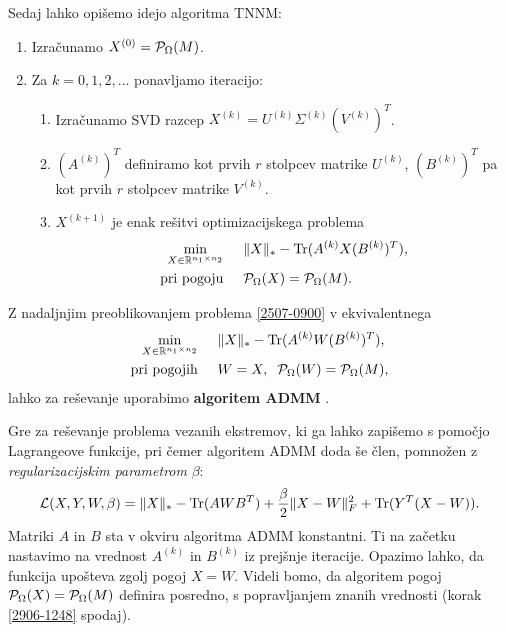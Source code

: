 Sedaj lahko opišemo idejo algoritma TNNM:
\begin{enumerate}
    \item Izračunamo $X^{(0)} = \mathcal{P}_\Omega(M)$.
    \item Za $k=0,1,2,\ldots$ ponavljamo iteracijo:
          \begin{enumerate}
              \item Izračunamo SVD razcep
                    $X^{(k)} = U^{(k)} \Sigma^{(k)} (V^{(k)})^T$.
              \item $(A^{(k)})^T$ definiramo kot prvih    $r$ stolpcev matrike $U^{(k)}$,
                    $(B^{(k)})^T$ pa kot prvih
                    $r$ stolpcev matrike $V^{(k)}$.
              \item $X^{(k+1)}$ je enak rešitvi
                    optimizacijskega problema
                    \begin{align}
                        \label{2507-0900}
                        \begin{split}
                            \min_{X\in  \mathbb{R}^{n_1 \times n_2}} \hspace{0.5cm}         & \lVert X\rVert_* - \operatorname{Tr}(A^{(k)}X(B^{(k)})^T), \\
                            \text{pri pogoju} \hspace{0.5cm} & \mathcal{P}_\Omega(X) = \mathcal{P}_\Omega(M).
                        \end{split}
                    \end{align}
          \end{enumerate}
\end{enumerate}
Z nadaljnjim preoblikovanjem problema
\eqref{2507-0900} v ekvivalentnega
\begin{align}
    \label{1307-1527}
    \begin{split}
        \min_{X\in  \mathbb{R}^{n_1 \times n_2}}  \hspace{0.5cm}         & \lVert X\rVert_* - \operatorname{Tr}(A^{(k)}W(B^{(k)})^T),  \\
        \text{pri pogojih} \hspace{0.5cm} & W=X, \hspace{0.2cm} \mathcal{P}_\Omega(W) = \mathcal{P}_\Omega(M),
    \end{split}
\end{align}
lahko za reševanje uporabimo \textbf{algoritem ADMM} \cite{TNNM-HZYLH12}.

Gre za reševanje problema vezanih ekstremov, ki ga lahko zapišemo s pomočjo Lagrangeove funkcije, pri čemer algoritem ADMM doda še
člen, pomnožen z \textit{regularizacijskim parametrom} $\beta$:
\[
    \mathcal{L}(X, Y, W, \beta) = \lVert X\rVert_* - \operatorname{Tr}(A W B^T) + \frac{\beta}{2} \lVert X - W\rVert_F^2 + \operatorname{Tr}(Y^T(X-W)).
\]
Matriki $A$ in $B$ sta v okviru algoritma ADMM konstantni. Ti na začetku nastavimo na vrednost $A^{(k)}$ in $B^{(k)}$ iz prejšnje iteracije. Opazimo lahko, da funkcija upošteva zgolj pogoj $X = W$. Videli bomo, da algoritem pogoj $\mathcal{P}_\Omega(X) = \mathcal{P}_\Omega(M)$ definira posredno, s popravljanjem znanih vrednosti (korak \eqref{2906-1248} spodaj).%


